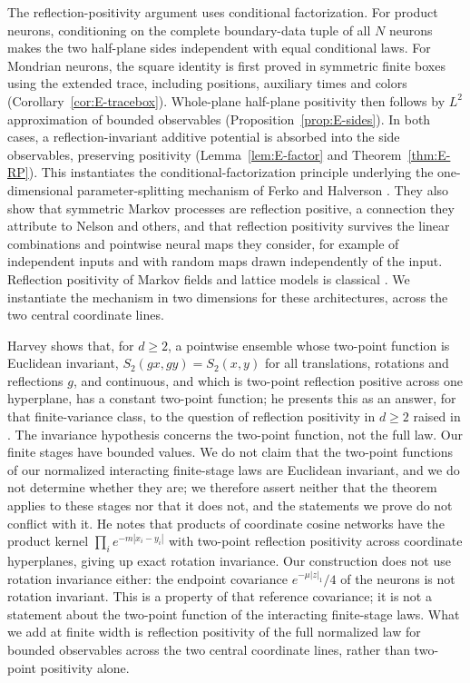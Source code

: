 \documentclass[11pt]{article}
\theoremstyle{plain}
\theoremstyle{definition}
\theoremstyle{remark}
\begin{document}
The reflection-positivity argument uses conditional factorization. For product neurons, conditioning on the complete boundary-data tuple of all $N$ neurons
makes the two half-plane sides independent with equal conditional laws. For Mondrian neurons, the square identity is first proved in symmetric finite boxes
using the extended trace, including positions, auxiliary times and colors (Corollary~\ref{cor:E-tracebox}). Whole-plane half-plane positivity then follows
by $L^2$ approximation of bounded observables (Proposition~\ref{prop:E-sides}). In both cases, a reflection-invariant additive potential is absorbed into the
side observables, preserving positivity (Lemma~\ref{lem:E-factor} and Theorem~\ref{thm:E-RP}). This instantiates the conditional-factorization principle
underlying the one-dimensional parameter-splitting mechanism of Ferko and Halverson \cite{FerkoHalverson2025QMNN}.
They also show that symmetric Markov processes are reflection
positive, a connection they attribute to Nelson and others, and that reflection
positivity survives the linear combinations and pointwise neural maps they
consider, for example of independent inputs and with random maps drawn
independently of the input. Reflection positivity of Markov fields and lattice
models is classical \cite{FILS1978}. We instantiate the mechanism in two
dimensions for these architectures, across the two central coordinate lines.

Harvey \cite{Harvey2026v2} shows that, for $d\ge2$, a pointwise ensemble whose
two-point function is Euclidean invariant, $S_2(gx,gy)=S_2(x,y)$ for all
translations, rotations and reflections $g$, and continuous, and which is
two-point reflection positive across one hyperplane, has a constant two-point
function; he presents this as an answer, for that finite-variance class, to the
question of reflection positivity in $d\ge2$ raised in
\cite{FerkoHalversonMutchler2026v1}. The invariance hypothesis concerns the
two-point function, not the full law. Our finite stages have bounded values. We
do not claim that the two-point functions of our normalized interacting
finite-stage laws are Euclidean invariant, and we do not determine whether they
are; we therefore assert neither that the theorem applies to these stages nor
that it does not, and the statements we prove do not conflict with it. He notes
that products of coordinate cosine networks have the product kernel
$\prod_ie^{-m|x_i-y_i|}$ with two-point reflection positivity across coordinate
hyperplanes, giving up exact rotation invariance. Our construction does not use
rotation invariance either: the endpoint covariance $e^{-\mu|z|_1}/4$ of the
neurons is not rotation invariant. This is a property of that reference
covariance; it is not a statement about the two-point function of the
interacting finite-stage laws. What we add at finite width is reflection
positivity of the full normalized law for bounded observables across the two
central coordinate lines, rather than two-point positivity alone.
\end{document}
